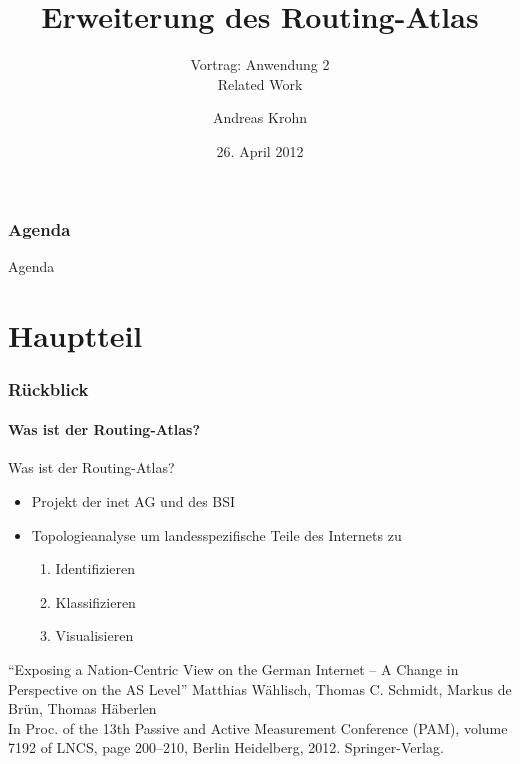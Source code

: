 \documentclass[ngerman,compress,hyperref={bookmarks}]{beamer}
\title{Erweiterung des Routing-Atlas}
\subtitle{Vortrag: Anwendung 2\\ Related Work}
\author{Andreas Krohn}
\institute[HAW]{Hochschule für Angewandte Wissenschaften Hamburg}
\date[SoSe 2012]{26. April 2012}
\begin{document}
\frame[plain]{\titlepage}

\section*{Agenda}
\begin{frame}{Agenda} \setcounter{tocdepth}{1} \tableofcontents[part=1] \setcounter{tocdepth}{3} \end{frame}

\part{Hauptteil}
\section{Rückblick}

\subsection{Was ist der Routing-Atlas?}
\begin{frame}{Was ist der Routing-Atlas?}
\nocite{wsbh-envgi-12}
  \begin{itemize}
    \item Projekt der inet AG und des BSI
    \item Topologieanalyse um landesspezifische Teile des Internets zu
    \begin{enumerate}
      \item Identifizieren
      \item Klassifizieren
      \item Visualisieren
    \end{enumerate}
  \end{itemize}
  \vspace{0.1cm}
  {\small
  \begin{thebibliography}{}
     ``Exposing a Nation-Centric View on the German Internet – A Change in Perspective on the AS Level''
    \newblock Matthias Wählisch, Thomas C. Schmidt, Markus de Brün, Thomas Häberlen\\
    \newblock In Proc. of the 13th Passive and Active Measurement Conference (PAM), volume 7192 of LNCS, page 200–210, Berlin Heidelberg, 2012. Springer-Verlag.\\[-20pt]
  \end{thebibliography}
  }
\end{frame}
\end{document}
